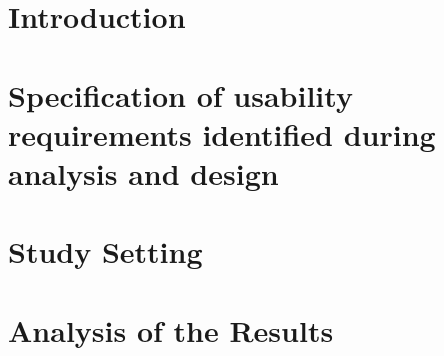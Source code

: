 \documentclass[11pt,oneside]{article}
\begin{document}
	
		
	\vspace*{0.5cm}

	
		
		
		
		\vspace*{-0.5cm}
		\tableofcontents
		\newpage

\clearpage
\justify
\section{Introduction}


\clearpage
\justify
\section{Specification of usability requirements identified during analysis and design}


\clearpage
\justify
\section{Study Setting}


\clearpage
\justify
\section{Analysis of the Results}


\clearpage

\end{document}
